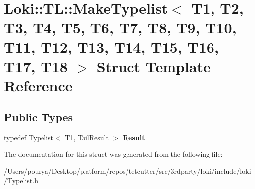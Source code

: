 \hypertarget{structLoki_1_1TL_1_1MakeTypelist}{}\section{Loki\+:\+:T\+L\+:\+:Make\+Typelist$<$ T1, T2, T3, T4, T5, T6, T7, T8, T9, T10, T11, T12, T13, T14, T15, T16, T17, T18 $>$ Struct Template Reference}
\label{structLoki_1_1TL_1_1MakeTypelist}
\subsection*{Public Types}
\begin{DoxyCompactItemize}
\item 
\hypertarget{structLoki_1_1TL_1_1MakeTypelist_a79cd42f62e50a2e5495a612a49120736}{}typedef \hyperlink{structLoki_1_1Typelist}{Typelist}$<$ T1, \hyperlink{structLoki_1_1Typelist}{Tail\+Result} $>$ {\bfseries Result}\label{structLoki_1_1TL_1_1MakeTypelist_a79cd42f62e50a2e5495a612a49120736}

\end{DoxyCompactItemize}


The documentation for this struct was generated from the following file\+:\begin{DoxyCompactItemize}
\item 
/\+Users/pourya/\+Desktop/platform/repos/tetcutter/src/3rdparty/loki/include/loki/Typelist.\+h\end{DoxyCompactItemize}
